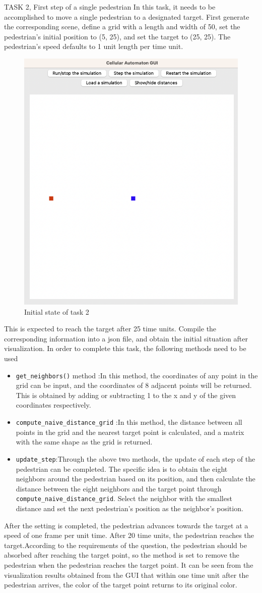 \documentclass[10pt,a4paper]{article}
\begin{document}
\begin{task}{TASK 2, First step of a single pedestrian}
In this task, it needs to be accomplished to move a single pedestrian to a designated target. First generate the corresponding scene, define a grid with a length and width of 50, set the pedestrian's initial position to (5, 25), and set the target to (25, 25). The pedestrian's speed defaults to 1 unit length per time unit. 
\begin{figure}[h]
      \centering
      \includegraphics[width=0.35\linewidth]{pictures/Task2_initial .png}
      \caption{Initial state of task 2}
      \label{fig:Initial state of task 2}
  \end{figure}
This is expected to reach the target after 25 time units. Compile the corresponding information into a json file, and obtain the initial situation after visualization. In order to complete this task, the following methods need to be used
\begin{itemize}
    \item \texttt{get\_neighbors()} method :In this method, the coordinates of any point in the grid can be input, and the coordinates of 8 adjacent points will be returned. This is obtained by adding or subtracting 1 to the x and y of the given coordinates respectively.
    \item \texttt{compute\_naive\_distance\_grid} :In this method, the distance between all points in the grid and the nearest target point is calculated, and a matrix with the same shape as the grid is returned.
    \item \texttt{update\_step}:Through the above two methods, the update of each step of the pedestrian can be completed. The specific idea is to obtain the eight neighbors around the pedestrian based on its position, and then calculate the distance between the eight neighbors and the target point through \texttt{compute\_naive\_distance\_grid}. Select the neighbor with the smallest distance and set the next pedestrian's position as the neighbor's position. 
\end{itemize}
After the setting is completed, the pedestrian advances towards the target at a speed of one frame per unit time. After 20 time units, the pedestrian reaches the target.According to the requirements of the question, the pedestrian should be absorbed after reaching the target point, so the method is set to remove the pedestrian when the pedestrian reaches the target point. It can be seen from the visualization results obtained from the GUI that within one time unit after the pedestrian arrives, the color of the target point returns to its original color.


\end{task}
\end{document}
